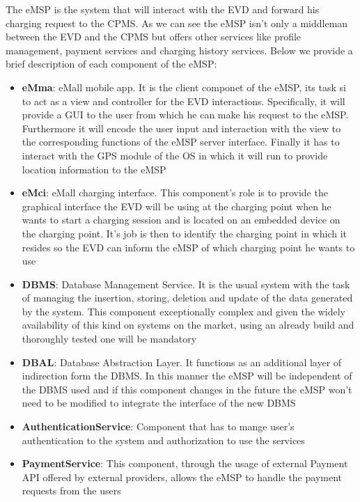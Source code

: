 The eMSP is the system that will interact with the EVD and forward his charging request to the CPMS. As we can see the eMSP isn't only a middleman between the EVD and the CPMS but offers other services like profile management, payment services and charging history services. Below we provide a brief description of each component of the eMSP:
\begin{itemize}
    \item \textbf{eMma}: eMall mobile app. It is the client componet of the eMSP, its task si to act as a view and controller for the EVD interactions. Specifically, it will provide a GUI to the user from which he can make his request to the eMSP. Furthermore it will encode the user input and interaction with the view to the corresponding functions of the eMSP server interface. Finally it has to interact with the GPS module of the OS in which it will run to provide location information to the eMSP
    
    \item \textbf{eMci}: eMall charging interface. This component's role is to provide the graphical interface the EVD will be using at the charging point when he wants to start a charging session and is located on an embedded device on the charging point. It's job is then to identify the charging point in which it resides so the EVD can inform the eMSP of which charging point he wants to use

    \item \textbf{DBMS}: Database Management Service. It is the usual system with the task of managing the insertion, storing, deletion and update of the data generated by the system. This component exceptionally complex and given the widely availability of this kind on systems on the market, using an already build and thoroughly tested one will be mandatory

    \item \textbf{DBAL}: Database Abstraction Layer. It functions as an additional layer of indirection form the DBMS. In this manner the eMSP will be independent of the DBMS used and if this component changes in the future the eMSP won't need to be modified to integrate the interface of the new DBMS

    \item \textbf{AuthenticationService}: Component that has to mange user's authentication to the system and authorization to use the services

    \item \textbf{PaymentService}: This component, through the usage of external Payment API offered by external providers, allows the eMSP to handle the payment requests from the users


\end{itemize}
